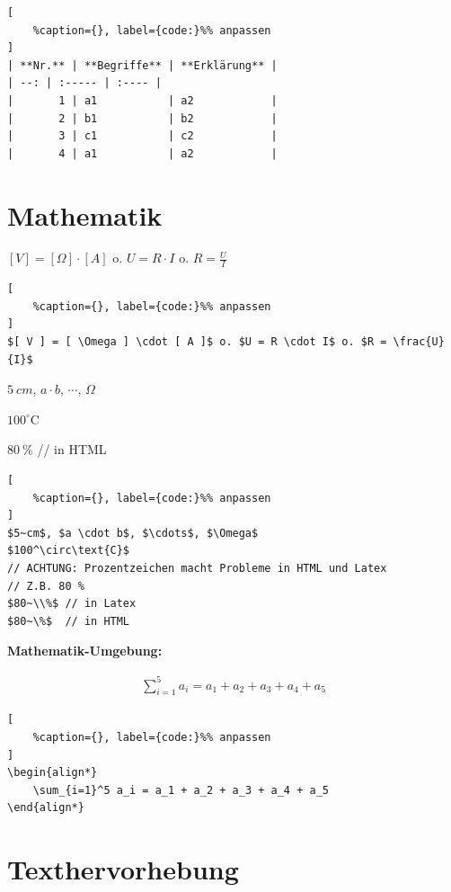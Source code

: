 \lstset{language=Python}%
\begin{lstlisting}[
	%caption={}, label={code:}%% anpassen
]
| **Nr.** | **Begriffe** | **Erklärung** |
| --: | :----- | :---- |
|       1 | a1           | a2            |
|       2 | b1           | b2            |
|       3 | c1           | c2            |
|       4 | a1           | a2            |
\end{lstlisting}

\section{Mathematik}\label{mathematik}

$[ V ] = [ \Omega ] \cdot [ A ]$ o. $U = R \cdot I$ o.
$R = \frac{U}{I}$

\lstset{language=Python}%
\begin{lstlisting}[
	%caption={}, label={code:}%% anpassen
]
$[ V ] = [ \Omega ] \cdot [ A ]$ o. $U = R \cdot I$ o. $R = \frac{U}{I}$
\end{lstlisting}

$5~cm$, $a \cdot b$, $\cdots$, $\Omega$

$100^\circ\text{C}$

$80~\%$ // in HTML

\lstset{language=Python}%
\begin{lstlisting}[
	%caption={}, label={code:}%% anpassen
]
$5~cm$, $a \cdot b$, $\cdots$, $\Omega$
$100^\circ\text{C}$  
// ACHTUNG: Prozentzeichen macht Probleme in HTML und Latex 
// Z.B. 80 %
$80~\\%$ // in Latex
$80~\%$  // in HTML
\end{lstlisting}

\textbf{Mathematik-Umgebung:}

\begin{align*}
    \sum_{i=1}^5 a_i = a_1 + a_2 + a_3 + a_4 + a_5
\end{align*}

\lstset{language=Python}%
\begin{lstlisting}[
	%caption={}, label={code:}%% anpassen
]
\begin{align*}
    \sum_{i=1}^5 a_i = a_1 + a_2 + a_3 + a_4 + a_5
\end{align*}
\end{lstlisting}

\section{Texthervorhebung}\label{texthervorhebung}

